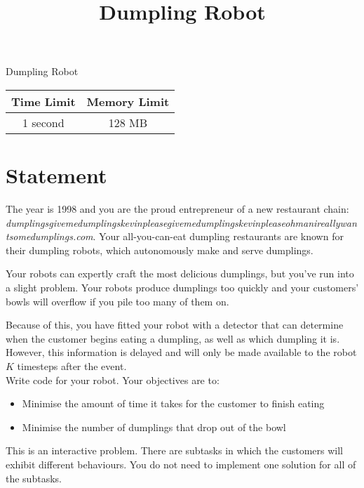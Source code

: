 \documentclass{article}
\begin{document}
\title{\vspace{-5ex}Dumpling Robot}
\author{\vspace{-5ex}}
\date{\vspace{-5ex}}
\pagestyle{fancy}
\fancyhf{}

\begin{center}
\huge{Dumpling Robot}\small\\
\vspace{5ex}
\begin{tabular}{|c|c|} 
\hline
Time Limit & Memory Limit \\
\hline
1 second & 128 MB \\

\hline
\end{tabular}
\end{center}
\section*{Statement}

The year is 1998 and you are the proud entrepreneur of a new restaurant chain: {\it dumplingsgivemedumplingskevinpleasegivemedumplingskevinpleaseohmanireallywantsomedumplings.com}. Your all-you-can-eat dumpling restaurants are known for their dumpling robots, which autonomously make and serve dumplings.

Your robots can expertly craft the most delicious dumplings, but you've run into a slight problem. Your robots produce dumplings too quickly and your customers' bowls will overflow if you pile too many of them on.

Because of this, you have fitted your robot with a detector that can determine when the customer begins eating a dumpling, as well as which dumpling it is. However, this information is delayed and will only be made available to the robot $K$ timesteps after the event. \\

\noindent Write code for your robot. Your objectives are to:
\begin{itemize}
\item Minimise the amount of time it takes for the customer to finish eating
\item Minimise the number of dumplings that drop out of the bowl
\end{itemize}

This is an interactive problem. There are subtasks in which the customers will exhibit different behaviours. You do not need to implement one solution for all of the subtasks.
\end{document}
